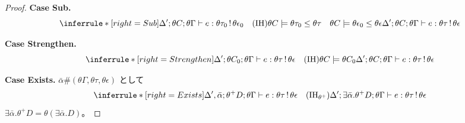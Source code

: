 \documentclass[a4paper,11pt]{article}
\theoremstyle{definition}
\newenvironment{Case}[1]{\par\smallskip\noindent\textbf{Case #1.}\enspace\ignorespaces}{\par}
\newcommand{\jj}[6]{#1;#2;#3\vdash #4:#5\,!\,#6}
\begin{document}
\begin{proof}
\begin{Case}{Sub}
\[
\inferrule*[right=Sub]{\jj{\Delta'}{\theta C}{\theta\Gamma}{e}{\theta\tau_0}{\theta\epsilon_0}\quad(\mathrm{IH})\\\theta C\models\theta\tau_0\leq\theta\tau\quad\theta C\models\theta\epsilon_0\leq\theta\epsilon}{\jj{\Delta'}{\theta C}{\theta\Gamma}{e}{\theta\tau}{\theta\epsilon}}
\]
\end{Case}

\begin{Case}{Strengthen}
\[
\inferrule*[right=Strengthen]{\jj{\Delta'}{\theta C_0}{\theta\Gamma}{e}{\theta\tau}{\theta\epsilon}\quad(\mathrm{IH})\\\theta C\models\theta C_0}{\jj{\Delta'}{\theta C}{\theta\Gamma}{e}{\theta\tau}{\theta\epsilon}}
\]
\end{Case}

\begin{Case}{Exists}
$\bar\alpha\#(\theta\Gamma,\theta\tau,\theta\epsilon)$ として
\[
\inferrule*[right=Exists]{\jj{\Delta',\bar\alpha}{\theta^+D}{\theta\Gamma}{e}{\theta\tau}{\theta\epsilon}\quad(\mathrm{IH}_{\theta^+})}{\jj{\Delta'}{\exists\bar\alpha.\theta^+D}{\theta\Gamma}{e}{\theta\tau}{\theta\epsilon}}
\]
$\exists\bar\alpha.\theta^+D=\theta(\exists\bar\alpha.D)$。
\end{Case}
\end{proof}
\end{document}
